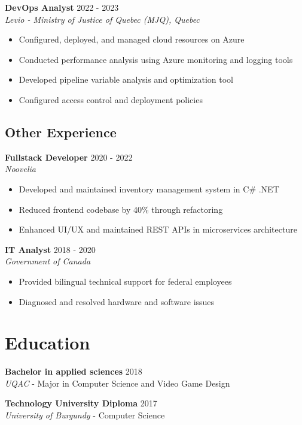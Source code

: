 ﻿\documentclass[11pt,letterpaper]{article}
\begin{document}
\textbf{DevOps Analyst} \hfill 2022 - 2023\\
\textit{Levio - Ministry of Justice of Quebec (MJQ), Quebec}
\begin{itemize}
\item Configured, deployed, and managed cloud resources on Azure
\item Conducted performance analysis using Azure monitoring and logging tools
\item Developed pipeline variable analysis and optimization tool
\item Configured access control and deployment policies
\end{itemize}

\subsection*{Other Experience}

\textbf{Fullstack Developer} \hfill 2020 - 2022\\
\textit{Noovelia}
\begin{itemize}
\item Developed and maintained inventory management system  in C\# .NET
\item Reduced frontend codebase by 40\% through refactoring
\item Enhanced UI/UX and maintained REST APIs in microservices architecture
\end{itemize}

\textbf{IT Analyst} \hfill 2018 - 2020\\
\textit{Government of Canada}
\begin{itemize}
\item Provided bilingual technical support for federal employees
\item Diagnosed and resolved hardware and software issues
\end{itemize}

\section*{Education}
\textbf{Bachelor in applied sciences} \hfill 2018\\
\textit{UQAC} - Major in Computer Science and Video Game Design

\textbf{Technology University Diploma} \hfill 2017\\
\textit{University of Burgundy} - Computer Science
\end{document}
